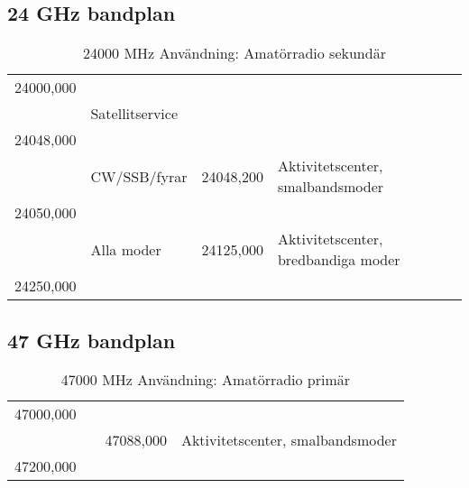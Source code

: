 \subsection{24 GHz bandplan}

\setlongtables
\begin{longtable}{llll}
\caption{24000 MHz Användning: Amatörradio sekundär} \\
24000,000 & & & \\
          & \multicolumn{3}{l}{Satellitservice} \\
24048,000 & & & \\
          & CW/SSB/fyrar & 24048,200 & Aktivitetscenter, smalbandsmoder \\
24050,000 & & & \\
          & Alla moder   & 24125,000 & Aktivitetscenter, bredbandiga moder \\
24250,000 & & & \\
\end{longtable}

\subsection{47 GHz bandplan}

\setlongtables
\begin{longtable}{llll}
\caption{47000 MHz Användning: Amatörradio primär} \\
47000,000 & & & \\
          & & 47088,000 & Aktivitetscenter, smalbandsmoder \\
47200,000 & & & \\
\end{longtable}
